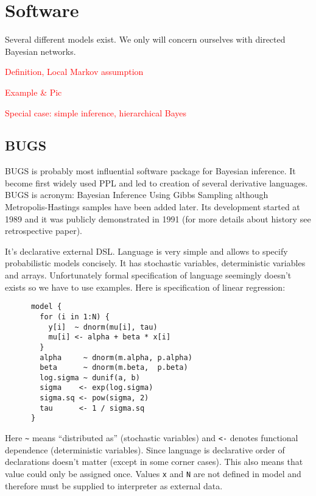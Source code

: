 \documentclass[a4paper]{article}
\newcommand{\FIXME}[1]{\textcolor{red}{#1}}
\begin{document}
\section{Software}

Several different models exist. We only will concern ourselves with directed
Bayesian networks.

\FIXME{Definition, Local Markov assumption}

\FIXME{Example \& Pic}

\FIXME{Special case: simple inference, hierarchical Bayes}



\subsection{BUGS}

BUGS\cite{gilks1994language} is probably most influential software package for
Bayesian inference. It become first widely used PPL and led to creation of
several derivative languages. BUGS is acronym: Bayesian Inference Using Gibbs
Sampling although Metropolis-Hastings samples have been added later. Its
development started at 1989 and it was publicly demonstrated in 1991 (for more
details about history see retrospective paper\cite{lunn2009bugs}).

It's declarative external DSL. Language is very simple and allows to specify
probabilistic models concisely. It has stochastic variables, deterministic
variables and arrays. Unfortunately formal specification of language seemingly
doesn't exists so we have to use examples. Here is specification of linear
regression:

\begin{verbatim}
      model {
        for (i in 1:N) {
          y[i]  ~ dnorm(mu[i], tau)
          mu[i] <- alpha + beta * x[i]
        }
        alpha     ~ dnorm(m.alpha, p.alpha)
        beta      ~ dnorm(m.beta,  p.beta)
        log.sigma ~ dunif(a, b)
        sigma    <- exp(log.sigma)
        sigma.sq <- pow(sigma, 2)
        tau      <- 1 / sigma.sq
      }
\end{verbatim}

Here \texttt{\~} means ``distributed as'' (stochastic variables) and \texttt{<-}
denotes functional dependence (deterministic variables). Since language is
declarative order of declarations doesn't matter (except in some corner cases).
This also means that value could only be assigned once. Values \texttt{x} and
\texttt{N} are not defined in model and therefore must be supplied to
interpreter as external data.
\end{document}
